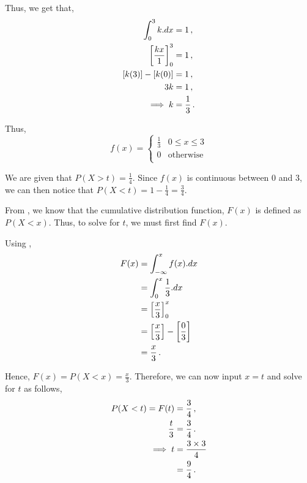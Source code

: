 \begin{subquestions}
\begin{subsubquestions}
Thus, we get that,
\begin{align}
	\int_{0}^{3} k.dx & = 1 \,, \nonumber \\
	\left[\frac{kx}{1} \right]_0^3 & = 1 \,, \nonumber \\
	[k(3)]-[k(0)] & = 1 \,, \nonumber \\
	3k & = 1 \,, \nonumber \\
	\implies k & = \frac{1}{3} \,.
\end{align}

Thus,
\[
f(x) =
\begin{cases}
	\frac{1}{3} & \text{$0 \leq x \leq 3$} \\
	0    & \text{otherwise} \\
\end{cases}
\]

\subsubquestion

We are given that $P(X>t) = \frac{1}{4}$. Since $f(x)$ is continuous between 0 and 3, we can then notice that $P(X<t)=1-\frac{1}{4}=\frac{3}{4}$.

From , we know that the cumulative distribution function, $F(x)$ is defined as $P(X<x)$. Thus, to solve for $t$, we must first find $F(x)$.

Using ,
\begin{align}
	F(x) & = \int_{-\infty}^{x} f(x).dx \nonumber \\
	     & = \int_{0}^{x} \frac{1}{3}.dx \nonumber \\
	     & = \left[\frac{x}{3} \right]_0^x \nonumber \\
	     & = \left[\frac{x}{3} \right] - \left[\frac{0}{3} \right] \nonumber \\
	     & = \frac{x}{3} \,.
\end{align}

Hence, $F(x)=P(X<x)=\frac{x}{3}$. Therefore, we can now input $x=t$ and solve for $t$ as follows,
\begin{align}
	P(X<t)=  F(t) & =\frac{3}{4}\,, \nonumber \\
	        \frac{t}{3} & = \frac{3}{4} \,. \nonumber \\
	        \implies  t & = \frac{3 \times 3}{4} \nonumber \\
	                    & = \frac{9}{4} \,.
\end{align}

\end{subsubquestions}

\end{subquestions}


